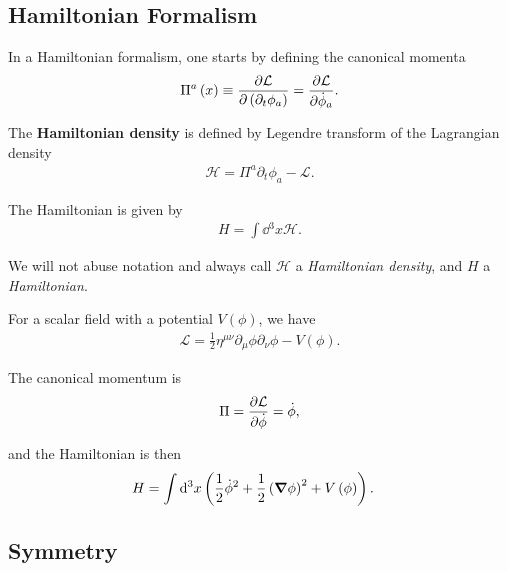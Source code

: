 
\subsection{Hamiltonian Formalism}


In a Hamiltonian formalism, one starts by defining the canonical momenta
\begin{align}
    \Pi^{a} \left( x \right) \equiv \pdv{\mathcal{L}}{\left( \partial_t \phi_a \right) } = \pdv{\mathcal{L}}{\dot{\phi}_a}
.\end{align}

\begin{definition}
    The \textbf{Hamiltonian density} is defined by Legendre transform  of the Lagrangian density
\begin{align}
    \mathcal{H} = \Pi^{a} \partial_t \phi_a - \mathcal{L}
.\end{align}
\end{definition}

The Hamiltonian is given by
\begin{align}
    H = \int \dd{^3x} \mathcal{H}
.\end{align}

We will not abuse notation and always call $\mathcal{H}$ a \textit{Hamiltonian density}, and $H$ a \textit{Hamiltonian}.

\begin{example}
    For a scalar field with a potential $V\left( \phi \right) $, we have
    \begin{align}
        \mathcal{L} = \frac{1}{2} \eta^{\mu \nu} \partial_\mu \phi \partial_\nu \phi - V \left( \phi \right) 
    .\end{align}

    The canonical momentum is
    \begin{align}
        \Pi = \pdv{\mathcal{L}}{\dot{\phi}} = \dot{\phi}
    ,\end{align}

    and the Hamiltonian is then
    \begin{align}
        H &=  \int \dd{^3 x} \left( \frac{1}{2} \dot{\phi}^2 + \frac{1}{2}\left( \grad \phi \right)^2 + V\left( \phi \right)  \right) 
    .\end{align}
\end{example}

\subsection{Symmetry}

